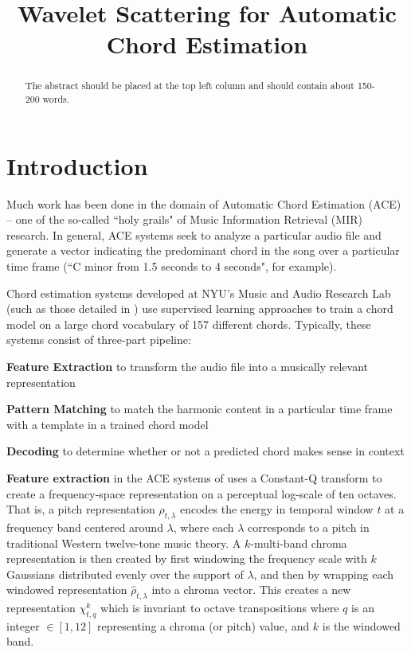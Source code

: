 \documentclass{article}
\title{Wavelet Scattering for Automatic Chord Estimation}
\begin{document}
%
\maketitle
%
\begin{abstract}
The abstract should be placed at the top left column and should contain about 150-200 words.
\end{abstract}


\section{Introduction}\label{sec:introduction}

Much work has been done in the domain of Automatic Chord Estimation (ACE) -- one of the so-called ``holy grails" of Music Information Retrieval (MIR) research. In general, ACE systems seek to analyze a particular audio file and generate a vector indicating the predominant chord in the song over a particular time frame (``C minor from 1.5 seconds to 4 seconds", for example). 
	
	Chord estimation systems developed at NYU's Music and Audio Research Lab (such as those detailed in \cite{cho2014on} \cite{humphrey2015four}) use supervised learning approaches to train a chord model on a large chord vocabulary of 157 different chords. Typically, these systems consist of three-part pipeline:
	\begin{description}
	\item{\textbf{Feature Extraction}} to transform the audio file into a musically relevant representation
	\item{\textbf{Pattern Matching}} to match the harmonic content in a particular time frame with a template in a trained chord model
	\item{\textbf{Decoding}} to determine whether or not a predicted chord makes sense in context
	\end{description}
	
	\textbf{Feature extraction} in the ACE systems of \cite{cho2014on} \cite{chothesis} uses a Constant-Q transform to create a frequency-space representation on a perceptual log-scale of ten octaves. That is, a pitch representation $\rho_{t,\lambda}$ encodes the energy in temporal window $t$ at a frequency band centered around $\lambda$, where each $\lambda$ corresponds to a pitch in traditional Western twelve-tone music theory. A $k$-multi-band chroma representation is then created by first windowing the frequency scale with $k$ Gaussians distributed evenly over the support of $\lambda$, and then by wrapping each windowed representation $\hat{\rho}_{t,\lambda}$ into a chroma vector. This creates a new representation $\chi^k_{t,q}$ which is invariant to octave transpositions where $q$ is an integer $\in [1,12]$ representing a chroma (or pitch) value, and $k$ is the windowed band. 
	
\end{document}

